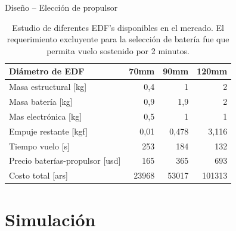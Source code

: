 \documentclass[10pt]{beamer}
\begin{document}
\begin{frame}{Diseño -- Elección de propulsor}
    \begin{table}[!ht]
        \centering
        \begin{tabular}{l|r|r|r}
    Diámetro de EDF    & \multicolumn{1}{l|}{70mm} & \multicolumn{1}{l|}{90mm} & \multicolumn{1}{l}{120mm} \\ \hline
        Masa estructural {[}kg{]}           & 0,4                       & 1                         & 2                          \\ \hline
        Masa batería       {[}kg{]}                 & 0,9                       & 1,9                       & 2                          \\ \hline
        Mas electrónica {[}kg{]}            & 0,5                       & 1                         & 1                          \\ \hline
        Empuje restante {[}kgf{]}           & 0,01                      & 0,478                     & 3,116                      \\ \hline
        Tiempo vuelo {[}s{]}                & 253              & 184              & 132                \\ \hline
        Precio baterías-propulsor {[}usd{]} & 165                   & 365                   & 693                   \\ \hline
        Costo total {[}ars{]}               & 23968              & 53017              & 101313                 \\ \hline
        \end{tabular}
        \caption{Estudio de diferentes EDF's disponibles en el mercado. El requerimiento excluyente para la selección de batería fue que permita vuelo sostenido por 2 minutos.}
        \label{tab:edfseleccion}
    \end{table}
\end{frame}

\section{Simulación}
\end{document}
